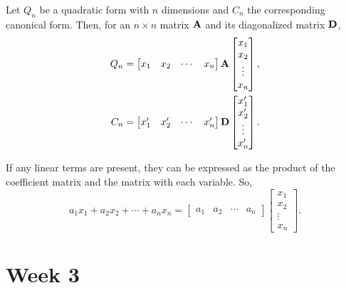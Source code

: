 \documentclass[11pt,twoside=semi,openright,numbers=noenddot]{scrbook}
\begin{document}
\begin{theorem}
Let $Q_n$ be a quadratic form with $n$ dimensions and $C_n$ the corresponding canonical form. Then, for an $n \times n$ matrix $\bold{A}$ and its diagonalized matrix $\bold{D}$,
    \begin{align*}
        Q_n &= \begin{bmatrix} x_1 & x_2 & \cdots & x_n \end{bmatrix} \bold{A} \begin{bmatrix} x_1 \\ x_2 \\ \vdots \\ x_n\end{bmatrix}, \\
    C_n &= \begin{bmatrix} x_1' & x_2' & \cdots & x_n' \end{bmatrix} \bold{D} \begin{bmatrix} x_1' \\ x_2' \\ \vdots \\ x_n'\end{bmatrix}.
    \end{align*}
\end{theorem}
If any linear terms are present, they can be expressed as the product of the coefficient matrix and the 
matrix with each variable. So, $$a_1x_1+a_2x_2+\cdots+a_nx_n = \begin{bmatrix}a_1 & a_2 & \cdots & a_n \end{bmatrix}
\begin{bmatrix} x_1 \\ x_2 \\ \vdots \\ x_n \end{bmatrix}.$$

\begin{exercise}

\end{exercise}
\newpage
\section{Week 3}
\end{document}
